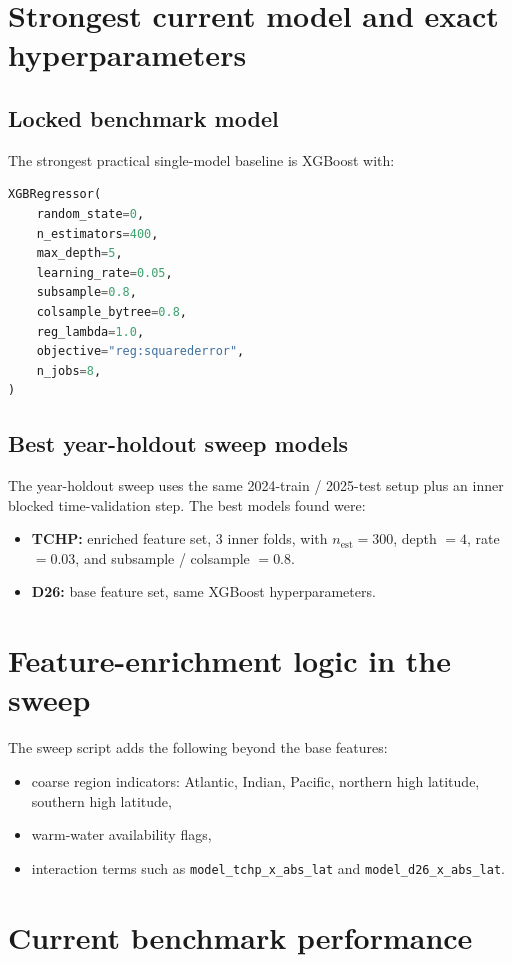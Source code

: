 \documentclass[11pt]{report}
\newcommand{\code}[1]{\texttt{#1}}
\begin{document}
\section{Strongest current model and exact hyperparameters}
\subsection{Locked benchmark model}
The strongest practical single-model baseline is XGBoost with:
\begin{lstlisting}[language=Python]
XGBRegressor(
    random_state=0,
    n_estimators=400,
    max_depth=5,
    learning_rate=0.05,
    subsample=0.8,
    colsample_bytree=0.8,
    reg_lambda=1.0,
    objective="reg:squarederror",
    n_jobs=8,
)
\end{lstlisting}

\subsection{Best year-holdout sweep models}
The year-holdout sweep uses the same 2024-train / 2025-test setup plus an inner blocked time-validation step. The best models found were:
\begin{itemize}[leftmargin=1.3em]
  \item \textbf{TCHP:} enriched feature set, 3 inner folds, with \(n_\mathrm{est}=300\), depth \(=4\), rate \(=0.03\), and subsample / colsample \(=0.8\).
  \item \textbf{D26:} base feature set, same XGBoost hyperparameters.
\end{itemize}

\section{Feature-enrichment logic in the sweep}
The sweep script adds the following beyond the base features:
\begin{itemize}[leftmargin=1.3em]
  \item coarse region indicators: Atlantic, Indian, Pacific, northern high latitude, southern high latitude,
  \item warm-water availability flags,
  \item interaction terms such as \code{model\_tchp\_x\_abs\_lat} and \code{model\_d26\_x\_abs\_lat}.
\end{itemize}

\section{Current benchmark performance}
\end{document}
